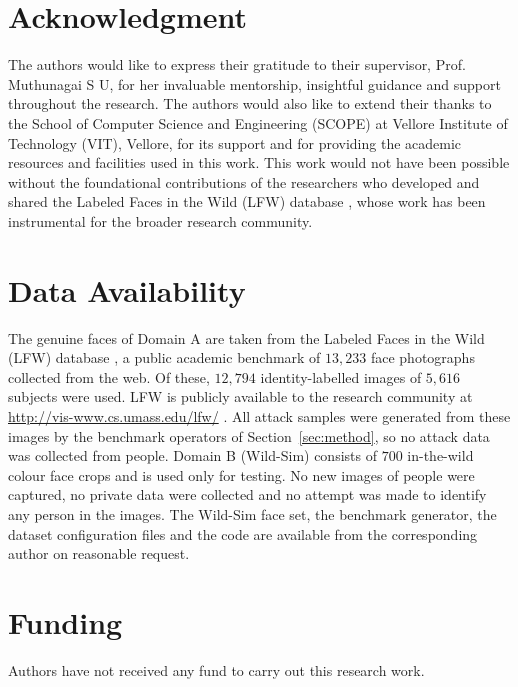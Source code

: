 \documentclass[conference]{IEEEtran}
\begin{document}
\section*{Acknowledgment}
The authors would like to express their gratitude to their supervisor, Prof.
Muthunagai S U, for her invaluable mentorship, insightful guidance and support
throughout the research. The authors would also like to extend their thanks to the
School of Computer Science and Engineering (SCOPE) at Vellore Institute of Technology
(VIT), Vellore, for its support and for providing the academic resources and
facilities used in this work. This work would not have been possible without the
foundational contributions of the researchers who developed and shared the Labeled
Faces in the Wild (LFW) database \cite{huang2007lfw}, whose work has been
instrumental for the broader research community.

\section*{Data Availability}
The genuine faces of Domain A are taken from the Labeled Faces in the Wild (LFW)
database \cite{huang2007lfw}, a public academic benchmark of $13{,}233$ face
photographs collected from the web. Of these, $12{,}794$ identity-labelled images of
$5{,}616$ subjects were used. LFW is publicly available to the research community at
\url{http://vis-www.cs.umass.edu/lfw/} \cite{lfwweb}. All attack samples were
generated from these images by the benchmark operators of
Section~\ref{sec:method}, so no attack data was collected from people. Domain B
(Wild-Sim) consists of $700$ in-the-wild colour face crops \cite{wildsim} and is used
only for testing. No new images of people were captured, no private data were
collected and no attempt was made to identify any person in the images. The
Wild-Sim face set, the benchmark generator, the dataset configuration files and the
code are available from the corresponding author on reasonable request.

\section*{Funding}
Authors have not received any fund to carry out this research work.



\end{document}
